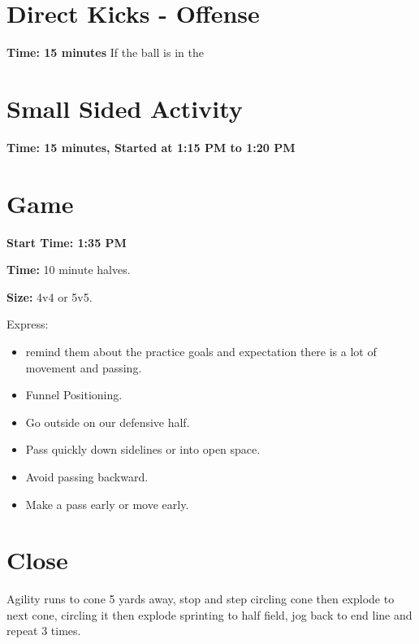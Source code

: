 \documentclass[10pt,letterpaper]{article}
\newenvironment{evenBlock}[1]{%
    \tcolorbox[beamer,%
    noparskip,breakable,
    colback=LightGreen,colframe=DarkGreen,%
    colbacklower=LimeGreen!75!LightGreen,%
    title=#1]}%
    {\endtcolorbox}
\newenvironment{oddBlock}[1]{%
    \tcolorbox[beamer,%
    noparskip,breakable,
    colback=LightBlue,colframe=DarkBlue,%
    colbacklower=DarkBlue!75!LightBlue,%
    title=#1]}%
    {\endtcolorbox}
\begin{document}
\section{Direct Kicks - Offense}
\textbf{Time: 15 minutes}
\begin{evenBlock}{Positions}
    If the ball is in the 
\end{evenBlock}

\section{Small Sided Activity}
\textbf{Time: 15 minutes, Started at 1:15 PM to 1:20 PM}


\section{Game}

\textbf{Start Time: 1:35 PM}

\begin{oddBlock}{Small Sided}
    \textbf{Time:} 10 minute halves.

    \textbf{Size:} 4v4 or 5v5.

    Express:
    \begin{itemize}
        \setlength{\itemsep}{0pt}
        \setlength{\parskip}{0pt}
        \setlength{\parsep}{0pt}
        \item  remind them about the practice goals and expectation there is a lot of movement and passing.
        \item Funnel Positioning.
        \item Go outside on our defensive half.
        \item Pass quickly down sidelines or into open space.
        \item Avoid passing backward.
        \item Make a pass early or move early.
    \end{itemize}

\end{oddBlock}

\section{Close}
\begin{oddBlock}{Sprints (5 min)}
    Agility runs to cone 5 yards away, stop and step circling cone then explode to next cone, circling it then explode sprinting to half field, jog back to end line and repeat 3 times.
\end{oddBlock}
\end{document}
